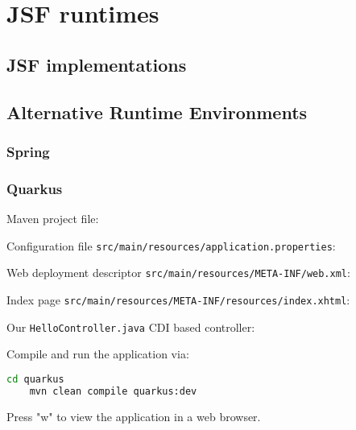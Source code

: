 %

\chapter{JSF runtimes}

\section{JSF implementations}

\section{Alternative Runtime Environments}

\subsection{Spring}

\subsection{Quarkus}

Maven project file:


Configuration file \texttt{src/main/resources/application.properties}:


Web deployment descriptor \texttt{src/main/resources/META-INF/web.xml}:


Index page \texttt{src/main/resources/META-INF/resources/index.xhtml}:


Our \texttt{HelloController.java} CDI based controller:


Compile and run the application via:
\begin{lstlisting}[language=bash]
	cd quarkus
	mvn clean compile quarkus:dev
\end{lstlisting}
Press "w" to view the application in a web browser.


